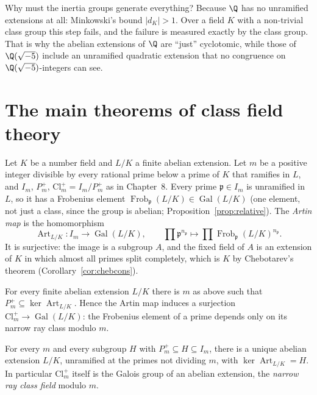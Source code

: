 \begin{think}
Why must the inertia groups generate everything? Because $\Q$ has no unramified extensions at all: Minkowski's bound $|d_K|>1$. Over a
field $K$ with a non-trivial class group this step fails, and the failure is measured exactly by the class group. That is why the
abelian extensions of $\Q$ are ``just'' cyclotomic, while those of $\Q(\sqrt{-5})$ include an unramified quadratic extension that no
congruence on $\Q(\sqrt{-5})$-integers can see.
\end{think}

\section{The main theorems of class field theory}

Let $K$ be a number field and $L/K$ a finite abelian extension. Let $m$ be a positive integer divisible by every rational prime below a
prime of $K$ that ramifies in $L$, and $I_m$, $P_m^+$, $\mathrm{Cl}_m^+=I_m/P_m^+$ as in Chapter~8. Every prime $\mathfrak p\in I_m$ is unramified in $L$,
so it has a Frobenius element $\operatorname{Frob}_{\mathfrak p}(L/K)\in\operatorname{Gal}(L/K)$ (one element, not just a class, since the group is abelian;
Proposition~\ref{prop:relative}). The \emph{Artin map} is the homomorphism
\[
\operatorname{Art}_{L/K}:I_m\to\operatorname{Gal}(L/K),\qquad\prod\mathfrak p^{n_{\mathfrak p}}\mapsto\prod\operatorname{Frob}_{\mathfrak p}(L/K)^{n_{\mathfrak p}}.
\]
It is surjective: the image is a subgroup $A$, and the fixed field of $A$ is an extension of $K$ in which almost all primes split completely,
which is $K$ by Chebotarev's theorem (Corollary~\ref{cor:chebcons}).

\begin{theorem}\label{thm:artin}
For every finite abelian extension $L/K$ there is $m$ as above such that $P_m^+\subseteq\ker\operatorname{Art}_{L/K}$. Hence the Artin map induces a
surjection $\mathrm{Cl}_m^+\to\operatorname{Gal}(L/K)$: the Frobenius element of a prime depends only on its narrow ray class modulo $m$.
\end{theorem}

\begin{theorem}\label{thm:cftexistence}
For every $m$ and every subgroup $H$ with $P_m^+\subseteq H\subseteq I_m$, there is a unique abelian extension $L/K$, unramified at the primes not dividing $m$,
with $\ker\operatorname{Art}_{L/K}=H$. In particular $\mathrm{Cl}_m^+$ itself is the Galois group of an abelian extension, the \emph{narrow ray class field}
modulo $m$.
\end{theorem}

